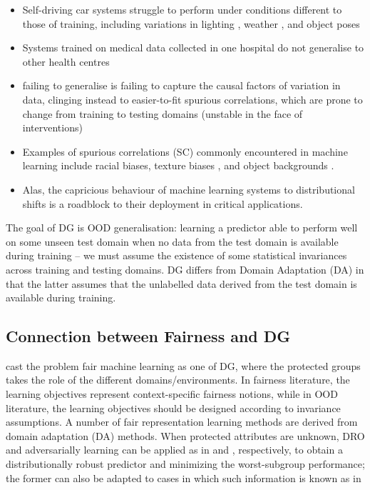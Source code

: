 \itemi\begin{itemize}
  \item Self-driving car systems struggle to perform under conditions different to those of 
    training, including variations in lighting \citep{dai2018dark}, weather \citep{volk2019towards}, 
    and object poses \citep{alcorn2019strike}
  \item Systems trained on medical data collected in one hospital do not generalise to other health
    centres \citep{castro2020causality, albadawy2018deep}
  \item failing to generalise is failing to capture the causal factors of variation in data, 
    clinging instead to easier-to-fit spurious correlations, which are prone to change from 
    training to testing domains (unstable in the face of interventions)
  \item  Examples of spurious correlations (SC) commonly encountered in machine learning include 
    racial biases, texture biases \citep{geirhos2018imagenet}, and object backgrounds
    \citep{beery2018recognition} .
  \item Alas, the capricious behaviour of machine learning systems to distributional shifts is a 
    roadblock to their deployment in critical applications.
\end{itemize}

The goal of DG is OOD generalisation: learning a predictor able to perform well on some unseen test
domain when no data from the test domain is available during training -- we must assume the 
existence of some statistical invariances across training and testing domains.
DG differs from Domain Adaptation (DA) in that the latter assumes that the unlabelled data derived 
from the test domain is available during training.


\subsection{Connection between Fairness and DG}\label{ssec:fairml_dg_cxn}
\citet{creager2021environment} cast the problem fair machine learning as one of DG,
where the protected groups takes the role of the different domains/environments. In fairness
literature, the learning objectives represent context-specific fairness notions,
while in OOD literature, the learning objectives should be designed according to invariance 
assumptions.
A number of fair representation learning methods \citep{edwards2015censoring, madras2018learning}
are derived from domain adaptation (DA) methods.
When protected attributes are unknown, DRO and adversarially learning can be applied as in 
\citet{hashimoto2018fairness} and \citet{lahoti2020fairness}, respectively, to obtain a 
distributionally robust predictor and minimizing the worst-subgroup performance; the former can
also be adapted to cases in which such information is known as in \citet{sagawa2019distributionally} 

